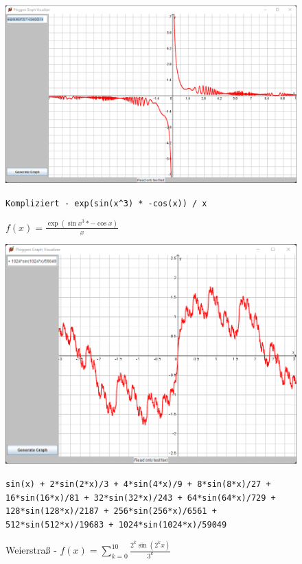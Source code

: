 \documentclass[12pt]{article}
\begin{document}
	\begin{figure}[!ht]
		\begin{center}
		\includegraphics[scale=0.5]{images/sample4.png}
		\end{center}
		\caption{$f(x) = \frac{\exp(\sin{x^3} * -\cos{x})}{x}$}

		\begin{center}
			\texttt{Kompliziert - exp(sin(x\textasciicircum 3) * -cos(x)) / x}
		\end{center}
	\end{figure}

	\begin{figure}[!ht]
		\begin{center}
		\includegraphics[scale=0.65]{images/sample5.png}
		\end{center}
		\caption{Weierstraß - $f(x) = \sum_{k=0}^{10} \frac{2^k \sin(2^k x)}{3^k}$}

		\begin{center}
			\texttt{sin(x) + 2*sin(2*x)/3 + 4*sin(4*x)/9 + 8*sin(8*x)/27 + 16*sin(16*x)/81 + 32*sin(32*x)/243 + 64*sin(64*x)/729 + 128*sin(128*x)/2187 + 256*sin(256*x)/6561 + 512*sin(512*x)/19683 + 1024*sin(1024*x)/59049}
		\end{center}
	\end{figure}
\end{document}
